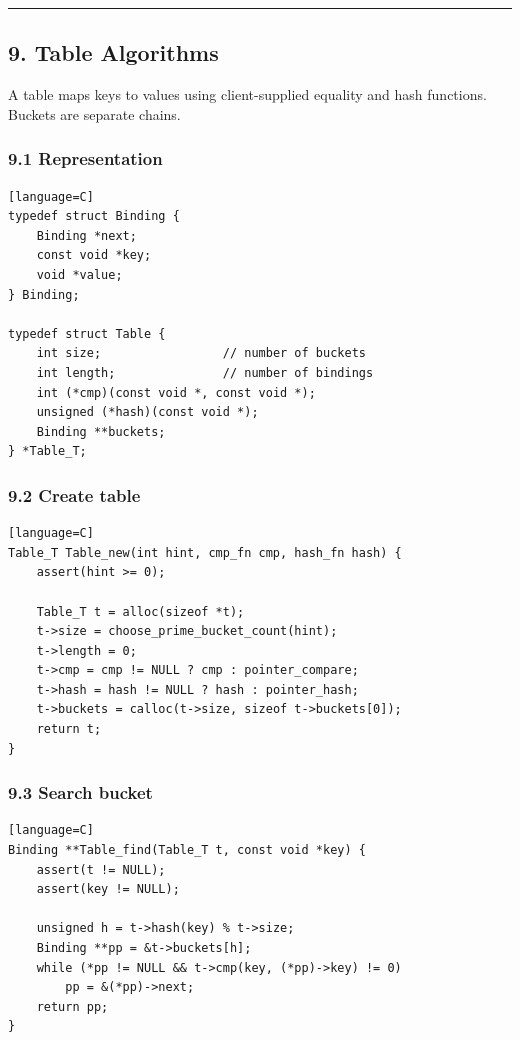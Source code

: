 \documentclass[11pt]{article}
\begin{document}
\begin{center}\rule{0.5\linewidth}{0.5pt}\end{center}

\subsection{9. Table Algorithms}\label{table-algorithms}

A table maps keys to values using client-supplied equality and hash functions. Buckets are separate chains.

\subsubsection{9.1 Representation}\label{representation-1}

\begin{verbatim}[language=C]
typedef struct Binding {
    Binding *next;
    const void *key;
    void *value;
} Binding;

typedef struct Table {
    int size;                 // number of buckets
    int length;               // number of bindings
    int (*cmp)(const void *, const void *);
    unsigned (*hash)(const void *);
    Binding **buckets;
} *Table_T;
\end{verbatim}

\subsubsection{9.2 Create table}\label{create-table}

\begin{verbatim}[language=C]
Table_T Table_new(int hint, cmp_fn cmp, hash_fn hash) {
    assert(hint >= 0);

    Table_T t = alloc(sizeof *t);
    t->size = choose_prime_bucket_count(hint);
    t->length = 0;
    t->cmp = cmp != NULL ? cmp : pointer_compare;
    t->hash = hash != NULL ? hash : pointer_hash;
    t->buckets = calloc(t->size, sizeof t->buckets[0]);
    return t;
}
\end{verbatim}

\subsubsection{9.3 Search bucket}\label{search-bucket}

\begin{verbatim}[language=C]
Binding **Table_find(Table_T t, const void *key) {
    assert(t != NULL);
    assert(key != NULL);

    unsigned h = t->hash(key) % t->size;
    Binding **pp = &t->buckets[h];
    while (*pp != NULL && t->cmp(key, (*pp)->key) != 0)
        pp = &(*pp)->next;
    return pp;
}
\end{verbatim}
\end{document}
